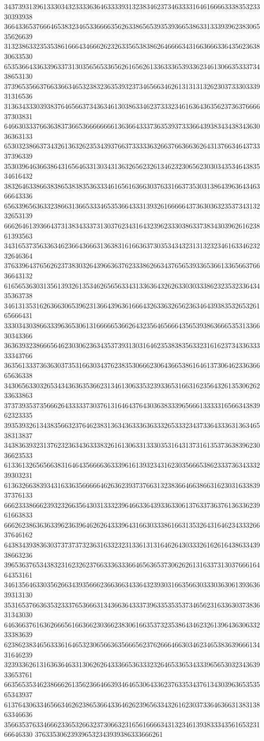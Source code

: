 34373931396133303432333363646333393132383462373463333164616666333835323330393938
36643365376664653832346533666635626338656539353936653863313339396238306535626639
31323863323535386166643466626232633565383862646666343166366633643562363830633530
65353664336339633731303565653365626165626133633365393362346130663533373438653130
37396535663766336634653238323635393237346566346261313131326230373330333931316536
31363433303938376465663734363461303863346237333234616364363562373637666637303831
64663033376636383736653666666661363664333736353937333664393834343834363036363133
65303238663734326136326235343937663733333632663766366362643137663464373337396339
35303964636638643165646331303431363265623261346232306562303034353464383534616432
38326463386638386538383536333461656163663037633166373530313864396364346366643336
65633965636332386631366533346535366433313932616666643736303632353734313232653139
66626461393664373138343337313037623431643239623330386337383430396261623861393563
34316537356336346236643666313638316166363730353434323131323234616334623232646364
37633964376562623738303264396636376233386266343765653933653661336566376636643132
61656536303135613932613534626565633431336364326263303033386232353233643435363738
34613135316263663065396231366439636166643263363265623634643938353265326165666431
33303430386633396365306131666665366264323564656664356539386366653531336630343366
36363932386665646230306236343537393130316462353838356332316162373433633333343766
36356133373636303735316630343762383530666230643665386164613730646233636665636338
34306563303265343436363536623134613063353239336531663162356432613530626233633863
37373935373566626433333730376131646437643036383339656661333331656634383962323335
39353932613438356632376462383136343633363633326533323437336433363136346538313837
34383639323137623236343633383261613063313330353164313731613537363839623036623533
61336132656566383164643566663633396161393234316230356665386233373634333239303231
61363266383934316336356666646263623937376631323836646638663162303163383937376133
66623338666239323266356430313332396466336439336330613763373637613633623961663833
66626238636363396236396462626433396431663033386166313532643164623433326637646162
64383439383630373737373236316332323133613131646264303332616261643863343938663236
39653637653438323162326237663336333664656365373062626131633731303766616464353161
34613564633035626634393566623663663433643239303166356630333036306139363639313130
35316537663635323337653666313436636433373963353535373465623163363037383631343030
64636637616362666561663662303662383061663537323538643462326139643630633233383639
62386238346563336164653230656636356665623762666466303462346538363966613431646239
32393362613163636463313062626433366536333232646533653433396565303234363933653761
66356535346238666261356236646639346465306433623763353437613430396365353565343937
61376430633465663462623865366433646262396563343261623037336463663138313863346636
35663537633466623365326632373066323165616666343132346139383334356165323166646330
376335306239396532343939386333666261
